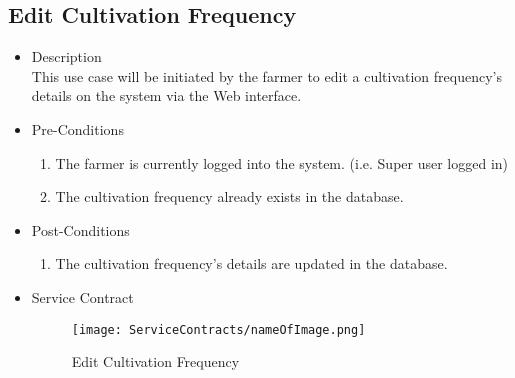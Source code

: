\documentclass[11pt,fleqn]{book} %
\begin{document}
\subsection{Edit Cultivation Frequency}
\begin{itemize}
	\item Description\\
	This use case will be initiated by the farmer to edit a cultivation frequency’s details on the system via the Web interface.
	\item Pre-Conditions
	\begin{enumerate}
		\item The farmer is currently logged into the system. (i.e. Super user logged in)
		\item The cultivation frequency already exists in the database.					
	\end{enumerate}
	\item Post-Conditions
	\begin{enumerate}
		\item The cultivation frequency’s details are updated in the database.
	\end{enumerate}
	\item Service Contract
	\begin{figure}
		\texttt{[image: ServiceContracts/nameOfImage.png]}
		\caption{Edit Cultivation Frequency}
	\end{figure}
\end{itemize}
\end{document}
